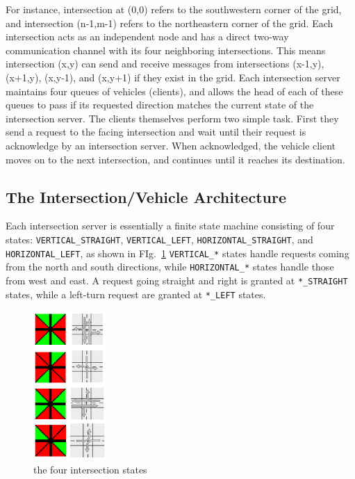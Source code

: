 \documentclass[conference]{IEEEtran}
\begin{document}
For instance, intersection at (0,0) refers to the southwestern corner of the grid, and intersection (n-1,m-1) refers to the northeastern corner of the grid. Each intersection acts as an independent node and has a direct two-way communication channel with its four neighboring intersections. This means intersection (x,y) can send and receive messages from intersections (x-1,y), (x+1,y), (x,y-1), and (x,y+1) if they exist in the grid. Each intersection server maintains four queues of vehicles (clients), and allows the head of each of these queues to pass if its requested direction matches the current state of the intersection server. The clients themselves perform two simple task. First they send a request to the facing intersection and wait until their request is acknowledge by an intersection server. When acknowledged, the vehicle client moves on to the next intersection, and continues until it reaches its destination.

\subsection{The Intersection/Vehicle Architecture}
Each intersection server is essentially a finite state machine consisting of four states: \texttt{VERTICAL\_STRAIGHT}, \texttt{VERTICAL\_LEFT}, \texttt{HORIZONTAL\_STRAIGHT}, and \texttt{HORIZONTAL\_LEFT}, as shown in FIg.~\ref{intersection_states} \texttt{VERTICAL\_*} states handle requests coming from the north and south directions, while \texttt{HORIZONTAL\_*} states handle those from west and east. A request going straight and right is granted at \texttt{*\_STRAIGHT} states, while a left-turn request are granted at \texttt{*\_LEFT} states.

\begin{figure}[h]
    \center    
    \includegraphics[width=0.25\textwidth]{images/intersection_states.png}
	\caption{the four intersection states}
	\label{intersection_states}
\end{figure}
\end{document}
